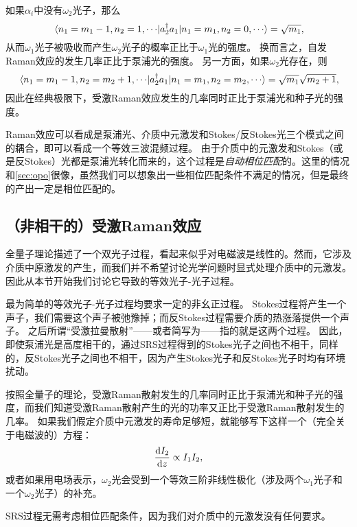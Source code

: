 如果$\alpha_i$中没有$\omega_2$光子，那么
\begin{equation}
    \mel*{n_1 = m_1 - 1, n_2 = 1, \cdots}{a_2^\dagger a_1}{n_1 = m_1, n_2 = 0, \cdots} = \sqrt{m_{1}},
\end{equation}
从而$\omega_1$光子被吸收而产生$\omega_2$光子的概率正比于$\omega_1$光的强度。
换而言之，自发Raman效应的发生几率正比于泵浦光的强度。
另一方面，如果$\omega_2$光存在，则
\begin{equation}
    \mel*{n_1 = m_1 - 1, n_2 = m_2 + 1, \cdots}{a^\dagger_2 a_1}{n_1 = m_1, n_2 = m_2, \cdots} = \sqrt{m_1} \sqrt{m_2 + 1},
\end{equation}
因此在经典极限下，受激Raman效应发生的几率同时正比于泵浦光和种子光的强度。

Raman效应可以看成是泵浦光、介质中元激发和Stokes/反Stokes光三个模式之间的耦合，即可以看成一个等效三波混频过程。
由于介质中的元激发和Stokes（或是反Stokes）光都是泵浦光转化而来的，这个过程是\emph{自动相位匹配}的。这里的情况和\autoref{sec:opo}很像，虽然我们可以想象出一些相位匹配条件不满足的情况，但是最终的产出一定是相位匹配的。

\subsection{（非相干的）受激Raman效应}

全量子理论描述了一个双光子过程，看起来似乎对电磁波是线性的。然而，它涉及介质中原激发的产生，而我们并不希望讨论光学问题时显式处理介质中的元激发。
因此从本节开始我们讨论它导致的等效光子-光子过程。

最为简单的等效光子-光子过程均要求一定的非幺正过程。
Stokes过程将产生一个声子，我们需要这个声子被弛豫掉；而反Stokes过程需要介质的热涨落提供一个声子。
之后所谓“受激拉曼散射”——或者简写为——指的就是这两个过程。
因此，即使泵浦光是高度相干的，通过SRS过程得到的Stokes光子之间也不相干，同样的，反Stokes光子之间也不相干，因为产生Stokes光子和反Stokes光子时均有环境扰动。

按照全量子的理论，受激Raman散射发生的几率同时正比于泵浦光和种子光的强度，而我们知道受激Raman散射产生的光的功率又正比于受激Raman散射发生的几率。
如果我们假定介质中元激发的寿命足够短，就能够写下这样一个（完全关于电磁波的）方程：
\begin{equation}
    \dv{I_2}{z} \propto I_1 I_2,
\end{equation}
或者如果用电场表示，$\omega_2$光会受到一个等效三阶非线性极化（涉及两个$\omega_1$光子和一个$\omega_2$光子）的补充。

SRS过程无需考虑相位匹配条件，因为我们对介质中的元激发没有任何要求。

